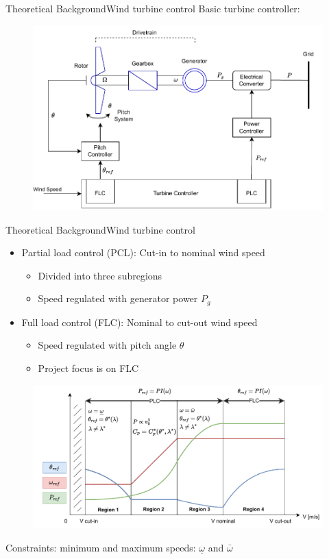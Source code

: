 \begin{frame}{Theoretical Background}{Wind turbine control}
	Basic turbine controller:
	\begin{figure}[ht]
		\centering
		\includegraphics[width=.8\linewidth]{../Graphics/PLC_PI.pdf}
		\label{fig:controller_overview}
	\end{figure}
\end{frame}


\begin{frame}{Theoretical Background}{Wind turbine control}
	
	\begin{itemize}
		\item Partial load control (PCL): Cut-in to nominal wind speed
		\begin{itemize}
			\item Divided into three subregions
			\item Speed regulated with generator power $ P_g $
		\end{itemize}
		\item Full load control (FLC): Nominal to cut-out wind speed
		\begin{itemize}
			\item Speed regulated with pitch angle $ \theta $
			\item Project focus is on FLC
		\end{itemize}
	\end{itemize}
	\begin{figure}[ht]
		\centering
		\includegraphics[width=1\linewidth]{../Graphics/OperatingRegions.pdf}
		\label{fig:operating_regions}
	\end{figure}
	Constraints: minimum and maximum speeds: $ \underline \omega $ and $ \bar \omega $
\end{frame}

